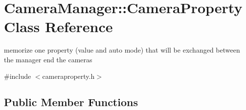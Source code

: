 \hypertarget{class_camera_manager_1_1_camera_property}{\section{Camera\-Manager\-:\-:Camera\-Property Class Reference}
\label{class_camera_manager_1_1_camera_property}
}


memorize one property (value and auto mode) that will be exchanged between the manager end the cameras  




{\ttfamily \#include $<$cameraproperty.\-h$>$}

\subsection*{Public Member Functions}
